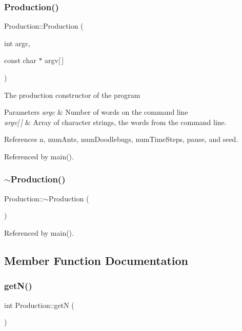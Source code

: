 \subsubsection{Production()}
{\footnotesize\ttfamily Production\+::\+Production (\begin{DoxyParamCaption}\item[{int}]{argc,  }\item[{const char $\ast$}]{argv[$\,$] }\end{DoxyParamCaption})}

The production constructor of the program 
\begin{DoxyParams}{Parameters}
{\em argc} & Number of words on the command line \\
\hline
{\em argv\mbox{[}$\,$\mbox{]}} & Array of character strings, the words from the command line. \\
\hline
\end{DoxyParams}


References n, num\+Ants, num\+Doodlebugs, num\+Time\+Steps, pause, and seed.



Referenced by main().

\mbox{\label{classProduction_ab5b3060f9e0a2bc189844e426d693dab}} 
\subsubsection{$\sim$\+Production()}
{\footnotesize\ttfamily Production\+::$\sim$\+Production (\begin{DoxyParamCaption}{ }\end{DoxyParamCaption})\hspace{0.3cm}{\ttfamily [virtual]}}



Referenced by main().



\subsection{Member Function Documentation}
\mbox{\label{classProduction_a5babff97aba3cdf4cd37e99a15470388}} 
\subsubsection{get\+N()}
{\footnotesize\ttfamily int Production\+::getN (\begin{DoxyParamCaption}{ }\end{DoxyParamCaption})}


